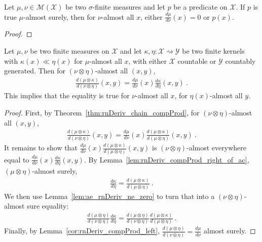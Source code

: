 \begin{lemma}
  \label{lem:ae_rnDeriv_ne_zero}
  \leanok
  \uses{}
  Let $\mu, \nu \in \mathcal M(\mathcal X)$ be two $\sigma$-finite measures and let $p$ be a predicate on $\mathcal X$.
  If $p$ is true $\mu$-almost surely, then for $\nu$-almost all $x$, either $\frac{d\mu}{d\nu}(x) = 0$ or $p(x)$.
\end{lemma}

\begin{proof}\leanok
\uses{}

\end{proof}


\begin{lemma}
  \label{lem:rnDeriv_compProd_aux}
  \leanok
  Let $\mu, \nu$ be two finite measures on $\mathcal X$ and let $\kappa, \eta : \mathcal X \rightsquigarrow \mathcal Y$ be two finite kernels with $\kappa(x) \ll \eta(x)$ for $\mu$-almost all $x$, with either $\mathcal X$ countable or $\mathcal{Y}$ countably generated.
  Then for $(\nu \otimes \eta)$-almost all $(x, y)$,
  \begin{align*}
  \frac{d (\mu \otimes \kappa)}{d (\nu \otimes \eta)}(x,y) = \frac{d\mu}{d\nu}(x)\frac{d \kappa}{d \eta}(x,y)
  \: .
  \end{align*}
  This implies that the equality is true for $\nu$-almost all $x$, for $\eta(x)$-almost all $y$.
\end{lemma}

\begin{proof} \leanok
{}
First, by Theorem~\ref{thm:rnDeriv_chain_compProd}, for $(\nu \otimes \eta)$-almost all $(x,y)$,
\begin{align*}
\frac{d(\mu \otimes \kappa)}{d(\nu \otimes \eta)}(x, y)
= \frac{d \mu}{d \nu}(x) \frac{d(\mu \otimes \kappa)}{d(\mu \otimes \eta)}(x, y)
\: .
\end{align*}
It remains to show that $\frac{d \mu}{d \nu}(x) \frac{d(\mu \otimes \kappa)}{d(\mu \otimes \eta)}(x, y)$ is $(\nu \otimes \eta)$-almost everywhere equal to $\frac{d\mu}{d\nu}(x)\frac{d \kappa}{d \eta}(x,y)$.
By Lemma~\ref{lem:rnDeriv_compProd_right_of_ac}, $(\mu \otimes \eta)$-almost surely,
\begin{align*}
\frac{d \kappa}{d \eta} = \frac{d (\mu \otimes \kappa)}{d (\mu \otimes \eta)}
\: .
\end{align*}
We then use Lemma~\ref{lem:ae_rnDeriv_ne_zero} to turn that into a $(\nu \otimes \eta)$-almost sure equality:
\begin{align*}
\frac{d(\mu \otimes \eta)}{d(\nu \otimes \eta)}\frac{d \kappa}{d \eta} = \frac{d(\mu \otimes \eta)}{d(\nu \otimes \eta)}\frac{d (\mu \otimes \kappa)}{d (\mu \otimes \eta)}
\: .
\end{align*}
Finally, by Lemma~\ref{cor:rnDeriv_compProd_left}, $\frac{d(\mu \otimes \eta)}{d(\nu \otimes \eta)} = \frac{d\mu}{d\nu}$ almost surely.
\end{proof}


